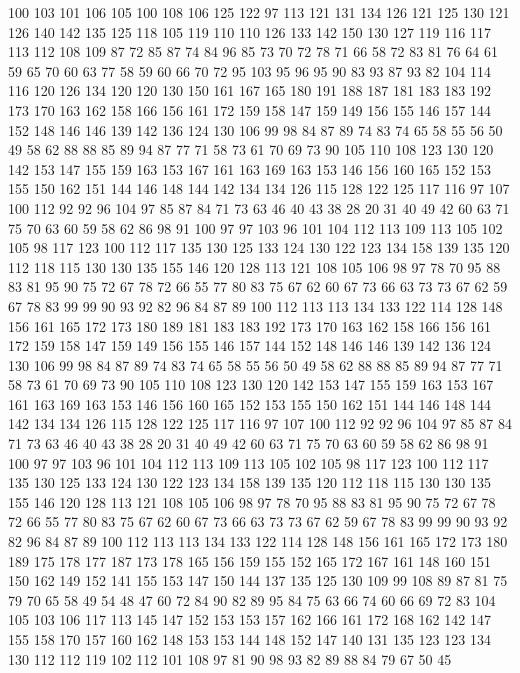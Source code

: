 100 103 101 106 105 100 108 106 125 122 97 113 121 131 134 126 121 125 130 121
126 140 142 135 125 118 105 119 110 110 126 133 142 150 130 127 119 116 117 113
112 108 109 87 72 85 87 74 84 96 85 73 70 72 78 71 66 58 72 83
81 76 64 61 59 65 70 60 63 77 58 59 60 66 70 72 95 103 95 96
95 90 83 93 87 93 82 104 114 116 120 126 134 120 120 130 150 161 167 165
180 191 188 187 181 183 183 192 173 170 163 162 158 166 156 161 172 159 158 147
159 149 156 155 146 157 144 152 148 146 146 139 142 136 124 130 106 99 98 84
87 89 74 83 74 65 58 55 56 50 49 58 62 88 88 85 89 94 87 77
71 58 73 61 70 69 73 90 105 110 108 123 130 120 142 153 147 155 159 163
153 167 161 163 169 163 153 146 156 160 165 152 153 155 150 162 151 144 146 148
144 142 134 134 126 115 128 122 125 117 116 97 107 100 112 92 92 96 104 97
85 87 84 71 73 63 46 40 43 38 28 20 31 40 49 42 60 63 71 75
70 63 60 59 58 62 86 98 91 100 97 97 103 96 101 104 112 113 109 113
105 102 105 98 117 123 100 112 117 135 130 125 133 124 130 122 123 134 158 139
135 120 112 118 115 130 130 135 155 146 120 128 113 121 108 105 106 98 97 78
70 95 88 83 81 95 90 75 72 67 78 72 66 55 77 80 83 75 67 62
60 67 73 66 63 73 73 67 62 59 67 78 83 99 99 90 93 92 82 96
84 87 89 100 112 113 113 134 133 122 114 128 148 156 161 165 172 173 180 189
181 183 183 192 173 170 163 162 158 166 156 161 172 159 158 147 159 149 156 155
146 157 144 152 148 146 146 139 142 136 124 130 106 99 98 84 87 89 74 83
74 65 58 55 56 50 49 58 62 88 88 85 89 94 87 77 71 58 73 61
70 69 73 90 105 110 108 123 130 120 142 153 147 155 159 163 153 167 161 163
169 163 153 146 156 160 165 152 153 155 150 162 151 144 146 148 144 142 134 134
126 115 128 122 125 117 116 97 107 100 112 92 92 96 104 97 85 87 84 71
73 63 46 40 43 38 28 20 31 40 49 42 60 63 71 75 70 63 60 59
58 62 86 98 91 100 97 97 103 96 101 104 112 113 109 113 105 102 105 98
117 123 100 112 117 135 130 125 133 124 130 122 123 134 158 139 135 120 112 118
115 130 130 135 155 146 120 128 113 121 108 105 106 98 97 78 70 95 88 83
81 95 90 75 72 67 78 72 66 55 77 80 83 75 67 62 60 67 73 66
63 73 73 67 62 59 67 78 83 99 99 90 93 92 82 96 84 87 89 100
112 113 113 134 133 122 114 128 148 156 161 165 172 173 180 189 175 178 177 187
173 178 165 156 159 155 152 165 172 167 161 148 160 151 150 162 149 152 141 155
153 147 150 144 137 135 125 130 109 99 108 89 87 81 75 79 70 65 58 49
54 48 47 60 72 84 90 82 89 95 84 75 63 66 74 60 66 69 72 83
104 105 103 106 117 113 145 147 152 153 153 157 162 166 161 172 168 162 142 147
155 158 170 157 160 162 148 153 153 144 148 152 147 140 131 135 123 123 134 130
112 112 119 102 112 101 108 97 81 90 98 93 82 89 88 84 79 67 50 45
